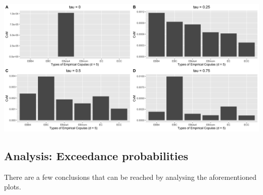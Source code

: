 \documentclass[12pt]{report}
\newcommand{\1}{\mathbf{1}}
\begin{document}
\begin{flushleft}
\begin{center}
\label{G_5d_s_CvM}
\includegraphics[width=17cm]{ExceedanceCvM/G_5d_s_CvM.png}
\end{center}%

\newpage
\subsection{Analysis: Exceedance probabilities}
\vspace{0.5cm}
There are a few conclusions that can be reached by analysing the aforementioned plots. \\


\end{flushleft}
\end{document}
